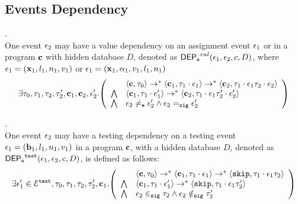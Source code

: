 \subsection{Events Dependency}
%
%
\begin{defn}
\label{def:event_valdep}.
\\
One event $\mathtt{\epsilon}_2$ may have a value dependency on an assignment event $\mathtt{\epsilon}_1$ or 
in a program ${\boldsymbol{\mathbf{c}}}$
with hidden database $D$, denoted as 
%
$\mathsf{DEP_{\mathtt{e}}}^{val}(\mathtt{\epsilon}_1, \mathtt{\epsilon}_2, c, D)$, where $\mathtt{\epsilon}_1 = ({\boldsymbol{\mathbf{x}}}_1, l_1, n_1, v_1) $ or 
$\mathtt{\epsilon}_1 = ({\boldsymbol{\mathbf{x}}}_1, \alpha_1, v_1, l_1, n_1)$
%
\[
\exists \vtrace_0,
\vtrace_1, \vtrace_2, \vtrace_2', \ssa{c}_1, \ssa{c}_2, \event_2'.
  \left(
  \begin{array}{ll}   
 & \config{\ssa{c}, \vtrace_0} \rightarrow^{*} 
\config{\ssa{c}_1, \vtrace_1 \cdot \event_1}  \rightarrow^{*} 
  \config{\ssa{c}_2,  \vtrace_1 \cdot \event_1 \vtrace_2 \cdot \event_2 } 
 \\ 
 \bigwedge &
  \config{\ssa{c}_1, \vtrace_1 \cdot \event_1'}  \rightarrow^{*} 
  \config{\ssa{c}_2,  \vtrace_1 \cdot \event_1 \vtrace_2' \cdot \event_2' } 
\\
\bigwedge &
\event_2 \eventneq \event_2' \land \event_2 \sigeq \event_2'
\end{array}
\right)
 \]
%
\end{defn}
%
\begin{defn}
\label{def:event_testdep}.
\\
One event $\mathtt{\epsilon}_2$ may have a testing dependency on a testing event $\mathtt{\epsilon}_1 = ({\boldsymbol{\mathbf{b}}}_1, l_1, n_1, v_1)$
in a program ${\boldsymbol{\mathbf{c}}}$, with a hidden database $D$, 
denoted as 
%
$\mathsf{DEP_{\mathtt{e}}}^{\mathtt{{test}}}(\mathtt{\epsilon}_1, \mathtt{\epsilon}_2, c, D)$, is defined as follows: 
%
\[
\exists \event_1' \in \eventset^{\test}, \vtrace_0,
\vtrace_1, \vtrace_2, \vtrace_2', \ssa{c}_1.
  \left(
  \begin{array}{ll}   
  & \config{\ssa{c}, \vtrace_0} \rightarrow^{*} 
    \config{\ssa{c}_1, \vtrace_1 \cdot \event_1}  \rightarrow^{*} 
    \config{\eskip,  \vtrace_1 \cdot \event_1 \vtrace_2} 
  \\ 
  \bigwedge &
  \config{\ssa{c}_1, \vtrace_1 \cdot \event_1'}  \rightarrow^{*} 
  \config{\eskip,  \vtrace_1 \cdot \event_1 \vtrace_2' } 
  \\
  \bigwedge &
  \event_2 \sigin \vtrace_2 \land \event_2 \notsigin \vtrace_2'
\end{array}
\right)
 \]
%
\end{defn}
